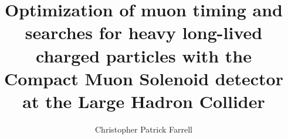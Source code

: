 \documentclass [PhD] {uclathes}
\title          {Optimization of muon timing and searches for heavy
                long-lived charged particles with the
                Compact Muon Solenoid detector at the
                Large Hadron Collider}
\author         {Christopher Patrick Farrell}
\begin{document}
%
\makeintropages

%












%

\newpage

%

\end{document}

